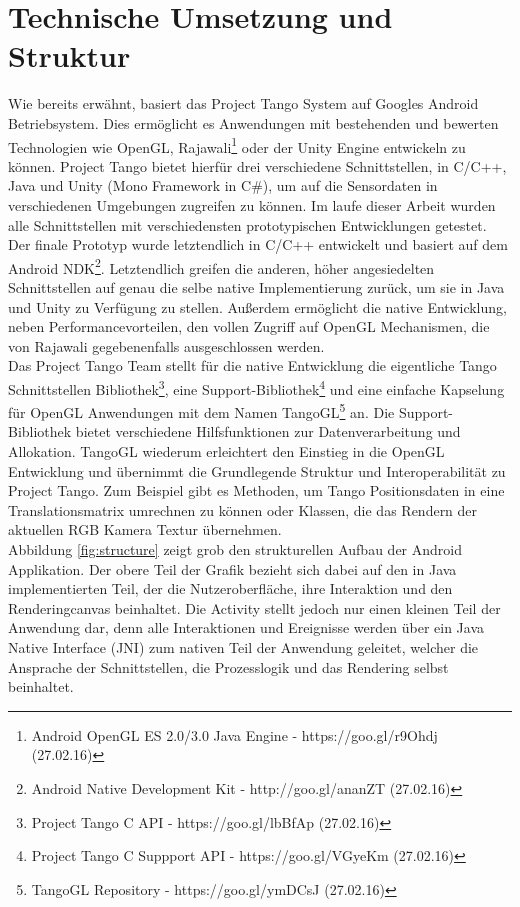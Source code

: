 \section{Technische Umsetzung und Struktur} \label{eq:technic}

Wie bereits erwähnt, basiert das Project Tango System auf Googles Android Betriebsystem. Dies ermöglicht es Anwendungen mit bestehenden und bewerten Technologien wie OpenGL, Rajawali\footnote{Android OpenGL ES 2.0/3.0 Java Engine - https://goo.gl/r9Ohdj (27.02.16)} oder der Unity Engine entwickeln zu können. Project Tango bietet hierfür drei verschiedene Schnittstellen, in C/C++, Java und Unity (Mono Framework in C\#), um auf die Sensordaten in verschiedenen Umgebungen zugreifen zu können. Im laufe dieser Arbeit wurden alle Schnittstellen mit verschiedensten prototypischen Entwicklungen getestet.\\

Der finale Prototyp wurde letztendlich in C/C++ entwickelt und basiert auf dem Android NDK\footnote{Android Native Development Kit - http://goo.gl/ananZT (27.02.16)}. Letztendlich greifen die anderen, höher angesiedelten Schnittstellen auf genau die selbe native Implementierung zurück, um sie in Java und Unity zu Verfügung zu stellen. Außerdem ermöglicht die native Entwicklung, neben Performancevorteilen, den vollen Zugriff auf OpenGL Mechanismen, die von Rajawali gegebenenfalls ausgeschlossen werden. \\

Das Project Tango Team stellt für die native Entwicklung die eigentliche Tango Schnittstellen Bibliothek\footnote{Project Tango C API - https://goo.gl/lbBfAp (27.02.16)}, eine Support-Bibliothek\footnote{Project Tango C Suppport API - https://goo.gl/VGyeKm (27.02.16)} und eine einfache Kapselung für OpenGL Anwendungen mit dem Namen TangoGL\footnote{TangoGL Repository - https://goo.gl/ymDCsJ (27.02.16)} an. Die Support-Bibliothek bietet verschiedene Hilfsfunktionen zur Datenverarbeitung und Allokation. TangoGL wiederum erleichtert den Einstieg in die OpenGL Entwicklung und übernimmt die Grundlegende Struktur und Interoperabilität zu Project Tango. Zum Beispiel gibt es Methoden, um Tango Positionsdaten in eine Translationsmatrix umrechnen zu können oder Klassen, die das Rendern der aktuellen RGB Kamera Textur übernehmen. \\

Abbildung \ref{fig:structure} zeigt grob den strukturellen Aufbau der Android Applikation. Der obere Teil der Grafik bezieht sich dabei auf den in Java implementierten Teil, der die Nutzeroberfläche, ihre Interaktion und den Renderingcanvas beinhaltet. Die Activity stellt jedoch nur einen kleinen Teil der Anwendung dar, denn alle Interaktionen und Ereignisse werden über ein Java Native Interface (JNI) zum nativen Teil der Anwendung geleitet, welcher die Ansprache der Schnittstellen, die Prozesslogik und das Rendering selbst beinhaltet. \\

